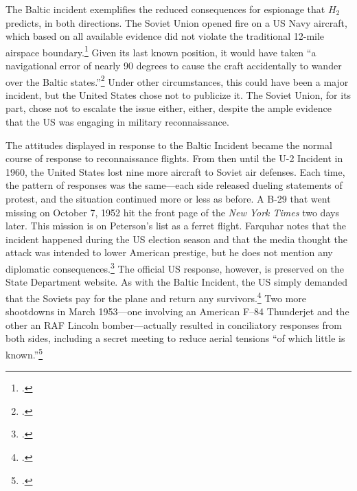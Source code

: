 \documentclass[14pt]{extarticle}
\begin{document}
The Baltic incident exemplifies the reduced consequences for espionage that $H_2$ predicts, in both directions. The Soviet Union opened fire on a US Navy aircraft, which based on all available evidence did not violate the traditional 12-mile airspace boundary.\footcite[p.~7. To be extra specific]{peterson_maybe_1993} Given its last known position, it would have taken ``a navigational error of nearly 90 degrees to cause the craft accidentally to wander over the Baltic states.''\footcite{the_new_york_times_soviet_1950} Under other circumstances, this could have been a major incident, but the United States chose not to publicize it. The Soviet Union, for its part, chose not to escalate the issue either, either, despite the ample evidence that the US was engaging in military reconnaissance.

The attitudes displayed in response to the Baltic Incident became the normal course of response to reconnaissance flights. From then until the U-2 Incident in 1960, the United States lost nine more aircraft to Soviet air defenses. Each time, the pattern of responses was the same---each side released dueling statements of protest, and the situation continued more or less as before. A B-29 that went missing on October 7, 1952 hit the front page of the \emph{New York Times} two days later. This mission is on Peterson's list as a ferret flight. Farquhar notes that the incident happened during the US election season and that the media thought the attack was intended to lower American prestige, but he does not mention any diplomatic consequences.\footcite[p.~43-44]{farquhar_aerial_2015} The official US response, however, is preserved on the State Department website. As with the Baltic Incident, the US simply demanded that the Soviets pay for the plane and return any survivors.\footcite{the_new_york_times_u.s._1952} Two more shootdowns in March 1953---one involving an American F–84 Thunderjet and the other an RAF Lincoln bomber---actually resulted in conciliatory responses from both sides, including a secret meeting to reduce aerial tensions \enquote{of which little is known.}\footcite[p.~45]{farquhar_aerial_2015}
\end{document}
